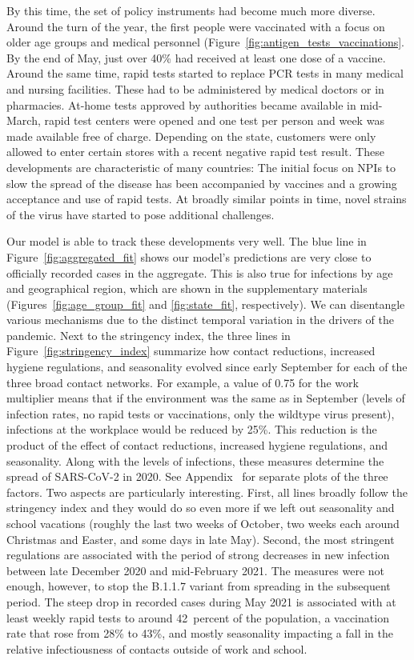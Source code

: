By this time, the set of policy instruments had become much more diverse. Around the
turn of the year, the first people were vaccinated with a focus on older age groups and
medical personnel (Figure~\ref{fig:antigen_tests_vaccinations}. By the end of May, just
over 40\% had received at least one dose of a vaccine. Around the same time, rapid tests
started to replace PCR tests in many medical and nursing facilities. These had to be
administered by medical doctors or in pharmacies. At-home tests approved by authorities
became available in mid-March, rapid test centers were opened and one test per person
and week was made available free of charge. Depending on the state, customers were only
allowed to enter certain stores with a recent negative rapid test result. These
developments are characteristic of many countries: The initial focus on NPIs to slow the
spread of the disease has been accompanied by vaccines and a growing acceptance and use
of rapid tests. At broadly similar points in time, novel strains of the virus have
started to pose additional challenges.

Our model is able to track these developments very well. The blue line in
Figure~\ref{fig:aggregated_fit} shows our model's predictions are very close to
officially recorded cases in the aggregate. This is also true for infections by
age and geographical region, which are shown in the supplementary materials
(Figures~\ref{fig:age_group_fit} and \ref{fig:state_fit}, respectively). We can
disentangle various mechanisms due to the distinct temporal variation in the
drivers of the pandemic. Next to the stringency index, the three lines in
Figure~\ref{fig:stringency_index} summarize how contact reductions, increased
hygiene regulations, and seasonality evolved since early September for each of
the three broad contact networks. For example, a value of 0.75 for the work
multiplier means that if the environment was the same as in September (levels of
infection rates, no rapid tests or vaccinations, only the wildtype virus
present), infections at the workplace would be reduced by 25\%. This reduction
is the product of the effect of contact reductions, increased hygiene
regulations, and seasonality. Along with the levels of infections, these
measures determine the spread of SARS-CoV-2 in 2020. See
Appendix~ for separate plots of the three factors. Two
aspects are particularly interesting. First, all lines broadly follow the
stringency index and they would do so even more if we left out seasonality and
school vacations (roughly the last two weeks of October, two weeks each around
Christmas and Easter, and some days in late May). Second, the most stringent
regulations are associated with the period of strong decreases in new infection
between late December 2020 and mid-February 2021. The measures were not enough,
however, to stop the B.1.1.7 variant from spreading in the subsequent period.
The steep drop in recorded cases during May 2021 is associated with at least
weekly rapid tests to around 42~percent of the population, a vaccination rate
that rose from 28\% to 43\%, and mostly seasonality impacting a fall in the
relative infectiousness of contacts outside of work and school.

